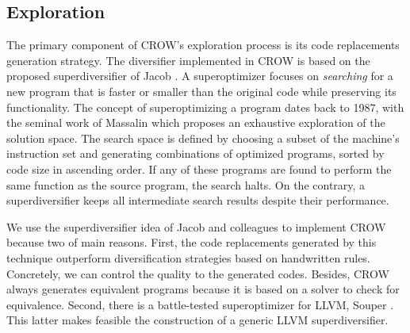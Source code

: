 
\subsection{Exploration}


The primary component of CROW's exploration process is its code replacements generation strategy. The diversifier implemented in CROW is based on the proposed superdiversifier of Jacob \etal \cite{jacob2008superdiversifier}.
A superoptimizer focuses on \emph{searching} for a new program that is faster or smaller than the original code while preserving its functionality.
The concept of superoptimizing a program dates back to 1987, with the seminal work of Massalin \cite{Massalin1987} which proposes an exhaustive exploration of the solution space. The search space is defined by choosing a subset of the machine's instruction set and generating combinations of optimized programs, sorted by code size in ascending order. If any of these programs are found to perform the same function as the source program, the search halts. On the contrary, a superdiversifier keeps all intermediate search results despite their performance. 

We use the superdiversifier idea of Jacob and colleagues to implement CROW because two of main reasons.
First, the code replacements generated by this technique outperform diversification strategies based on handwritten rules. Concretely, we can control the quality to the generated codes. Besides, CROW always generates equivalent programs because it is based on a solver to check for equivalence. 
Second, there is a battle-tested superoptimizer for LLVM, Souper \cite{Sasnauskas2017Souper:Superoptimizer}. This latter makes feasible the construction of a generic LLVM superdiversifier. 

